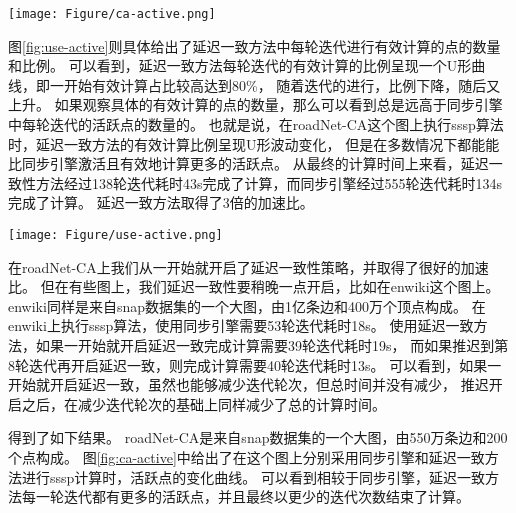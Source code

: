 
\begin{center}
  \texttt{[image: Figure/ca-active.png]}
  \label{fig:ca-active}
\end{center}  

图\ref{fig:use-active}则具体给出了延迟一致方法中每轮迭代进行有效计算的点的数量和比例。
可以看到，延迟一致方法每轮迭代的有效计算的比例呈现一个U形曲线，即一开始有效计算占比较高达到80\%，
随着迭代的进行，比例下降，随后又上升。
如果观察具体的有效计算的点的数量，那么可以看到总是远高于同步引擎中每轮迭代的活跃点的数量的。
也就是说，在roadNet-CA这个图上执行sssp算法时，延迟一致方法的有效计算比例呈现U形波动变化，
但是在多数情况下都能能比同步引擎激活且有效地计算更多的活跃点。  
从最终的计算时间上来看，延迟一致性方法经过138轮迭代耗时43s完成了计算，而同步引擎经过555轮迭代耗时134s完成了计算。
延迟一致方法取得了3倍的加速比。

\begin{center}
  \texttt{[image: Figure/use-active.png]}
  \label{fig:use-active}
\end{center}  

在roadNet-CA上我们从一开始就开启了延迟一致性策略，并取得了很好的加速比。
但在有些图上，我们延迟一致性要稍晚一点开启，比如在enwiki这个图上。
enwiki同样是来自snap数据集的一个大图，由1亿条边和400万个顶点构成。
在enwiki上执行sssp算法，使用同步引擎需要53轮迭代耗时18s。
使用延迟一致方法，如果一开始就开启延迟一致完成计算需要39轮迭代耗时19s，
而如果推迟到第8轮迭代再开启延迟一致，则完成计算需要40轮迭代耗时13s。
可以看到，如果一开始就开启延迟一致，虽然也能够减少迭代轮次，但总时间并没有减少，
推迟开启之后，在减少迭代轮次的基础上同样减少了总的计算时间。

得到了如下结果。
roadNet-CA是来自snap数据集的一个大图，由550万条边和200个点构成。
图\ref{fig:ca-active}中给出了在这个图上分别采用同步引擎和延迟一致方法进行sssp计算时，活跃点的变化曲线。
可以看到相较于同步引擎，延迟一致方法每一轮迭代都有更多的活跃点，并且最终以更少的迭代次数结束了计算。